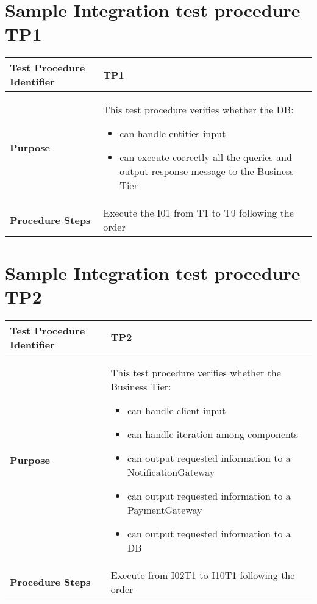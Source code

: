\section{Sample Integration test procedure TP1} \label{TP1}
\begin{center}
	\vspace{0.6cm}
	\begin{tabular}{|l|p{9cm}|}
		\hline
		\textbf{Test Procedure Identifier} & TP1 \bigstrut \\\hline
		\textbf{Purpose} 
		& This test procedure verifies whether the DB: 
		\begin{itemize} 
			\item can handle entities input
			\item can execute correctly all the queries and output response message to the Business Tier %
		\end{itemize} \bigstrut \\\hline
		\textbf{Procedure Steps} & Execute the I01 from T1 to T9 following the order \bigstrut \\\hline
	\end{tabular}
\end{center}

\section{Sample Integration test procedure TP2} \label{TP2}
\begin{center}
	\vspace{0.6cm}
	\begin{tabular}{|l|p{9cm}|}
		\hline
		\textbf{Test Procedure Identifier} & TP2 \bigstrut \\\hline
		\textbf{Purpose} 
		& This test procedure verifies whether the Business Tier: 
		\begin{itemize} 
			\item can handle client input
			\item can handle iteration among components 
			\item can output requested information to a NotificationGateway
			\item can output requested information to a PaymentGateway
			\item can output requested information to a DB
		\end{itemize} \bigstrut \\\hline
		\textbf{Procedure Steps} & Execute from I02T1 to I10T1 following the order \bigstrut \\\hline %
	\end{tabular}
\end{center}

